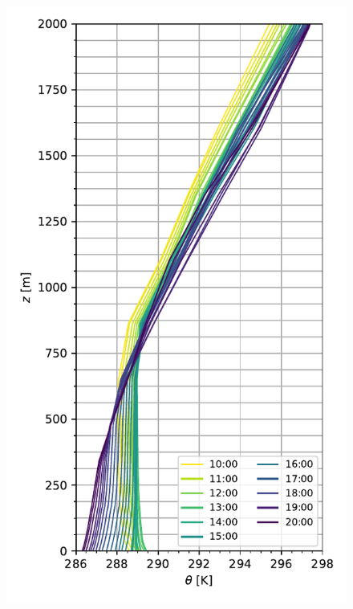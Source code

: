\begin{figure}[H]
	\begin{minipage}{0.5\linewidth}
	\end{minipage}%
	\begin{minipage}{0.5\linewidth}
	\end{minipage}%
	
	\begin{minipage}{0.5\linewidth}
		\centering
		\includegraphics[width=0.86\linewidth,trim={0cm 5mm 0cm 0mm},clip]{Imagenes/06/hov/pbl}%
	\end{minipage}%
	\begin{minipage}{0.5\linewidth}
		\centering

\end{minipage}
\end{figure}
